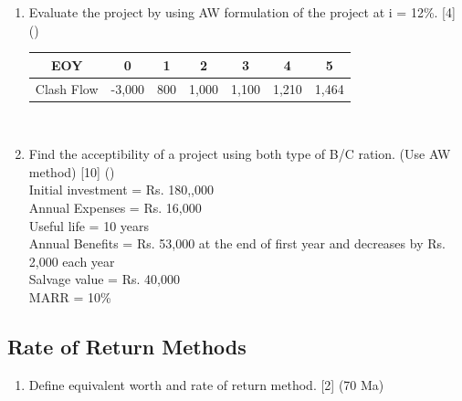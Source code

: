 \documentclass[12pt]{article}
\begin{document}
\begin{enumerate}[noitemsep, topsep = 0pt]
		\item Evaluate the project by using AW formulation of the project at i = 12\%. \hfill [4] ()\\
		\begin{tabular}{|c|c|c|c|c|c|c|}
			\hline
			EOY & 0 & 1 & 2 & 3 & 4 & 5\\ \hline
			Clash Flow & -3,000 & 800 & 1,000 & 1,100 & 1,210 & 1,464\\ \hline
		\end{tabular}\\[0pt]
		
		\item Find the acceptibility of a project using both type of B/C ration. (Use AW method) \hfill [10] ()\\
		Initial investment = Rs. 180,,000\\
		Annual Expenses = Rs. 16,000\\
		Useful life = 10 years\\
		Annual Benefits = Rs. 53,000 at the end of first year and decreases by Rs. 2,000 each year\\
		Salvage value = Rs. 40,000\\
		MARR = 10\%
	\end{enumerate}

	\subsection{Rate of Return Methods}
	\begin{enumerate} [noitemsep, topsep = 0pt]
		\item Define equivalent worth and rate of return method. \hfill [2] (70 Ma)
	\end{enumerate}
\end{document}
